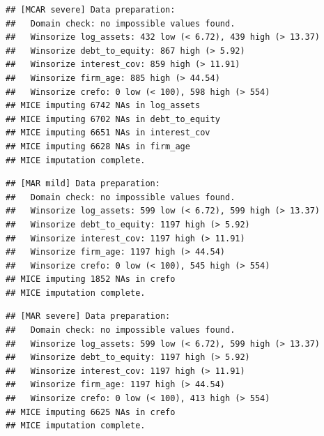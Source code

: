 \documentclass[
]{article}
\newenvironment{Shaded}{\begin{snugshade}}{\end{snugshade}}
\newcommand{\AttributeTok}[1]{\textcolor[rgb]{0.13,0.29,0.53}{#1}}
\newcommand{\FunctionTok}[1]{\textcolor[rgb]{0.13,0.29,0.53}{\textbf{#1}}}
\newcommand{\NormalTok}[1]{#1}
\newcommand{\OtherTok}[1]{\textcolor[rgb]{0.56,0.35,0.01}{#1}}
\newcommand{\SpecialCharTok}[1]{\textcolor[rgb]{0.81,0.36,0.00}{\textbf{#1}}}
\newcommand{\StringTok}[1]{\textcolor[rgb]{0.31,0.60,0.02}{#1}}
\begin{document}
\begin{verbatim}
## [MCAR severe] Data preparation:
##   Domain check: no impossible values found.
##   Winsorize log_assets: 432 low (< 6.72), 439 high (> 13.37)
##   Winsorize debt_to_equity: 867 high (> 5.92)
##   Winsorize interest_cov: 859 high (> 11.91)
##   Winsorize firm_age: 885 high (> 44.54)
##   Winsorize crefo: 0 low (< 100), 598 high (> 554)
## MICE imputing 6742 NAs in log_assets
## MICE imputing 6702 NAs in debt_to_equity
## MICE imputing 6651 NAs in interest_cov
## MICE imputing 6628 NAs in firm_age
## MICE imputation complete.
\end{verbatim}

\begin{Shaded}
\end{Shaded}

\begin{verbatim}
## [MAR mild] Data preparation:
##   Domain check: no impossible values found.
##   Winsorize log_assets: 599 low (< 6.72), 599 high (> 13.37)
##   Winsorize debt_to_equity: 1197 high (> 5.92)
##   Winsorize interest_cov: 1197 high (> 11.91)
##   Winsorize firm_age: 1197 high (> 44.54)
##   Winsorize crefo: 0 low (< 100), 545 high (> 554)
## MICE imputing 1852 NAs in crefo
## MICE imputation complete.
\end{verbatim}

\begin{Shaded}
\end{Shaded}

\begin{verbatim}
## [MAR severe] Data preparation:
##   Domain check: no impossible values found.
##   Winsorize log_assets: 599 low (< 6.72), 599 high (> 13.37)
##   Winsorize debt_to_equity: 1197 high (> 5.92)
##   Winsorize interest_cov: 1197 high (> 11.91)
##   Winsorize firm_age: 1197 high (> 44.54)
##   Winsorize crefo: 0 low (< 100), 413 high (> 554)
## MICE imputing 6625 NAs in crefo
## MICE imputation complete.
\end{verbatim}
\end{document}
